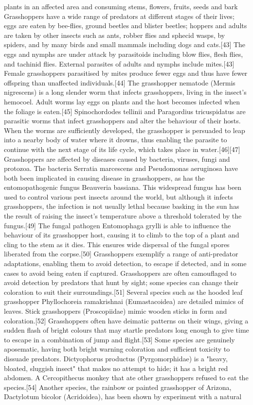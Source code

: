 \documentclass[twoside, 12pt, letterpaper]{report}\usepackage[]{graphicx}\usepackage[]{color}
\begin{document}
\begin{multicols*}{2}
plants in an affected area and consuming stems, flowers, fruits, seeds and bark Grasshoppers have a wide range of predators at different stages of their lives; eggs are eaten by bee-flies, ground beetles and blister beetles; hoppers and adults are taken by other insects such as ants, robber flies and sphecid wasps, by spiders, and by many birds and small mammals including dogs and cats.[43] The eggs and nymphs are under attack by parasitoids including blow flies, flesh flies, and tachinid flies. External parasites of adults and nymphs include mites.[43] Female grasshoppers parasitised by mites produce fewer eggs and thus have fewer offspring than unaffected individuals.[44] The grasshopper nematode (Mermis nigrescens) is a long slender worm that infects grasshoppers, living in the insect's hemocoel. Adult worms lay eggs on plants and the host becomes infected when the foliage is eaten.[45] Spinochordodes tellinii and Paragordius tricuspidatus are parasitic worms that infect grasshoppers and alter the behaviour of their hosts. When the worms are sufficiently developed, the grasshopper is persuaded to leap into a nearby body of water where it drowns, thus enabling the parasite to continue with the next stage of its life cycle, which takes place in water.[46][47] Grasshoppers are affected by diseases caused by bacteria, viruses, fungi and protozoa. The bacteria Serratia marcescens and Pseudomonas aeruginosa have both been implicated in causing disease in grasshoppers, as has the entomopathogenic fungus Beauveria bassiana. This widespread fungus has been used to control various pest insects around the world, but although it infects grasshoppers, the infection is not usually lethal because basking in the sun has the result of raising the insect's temperature above a threshold tolerated by the fungus.[49] The fungal pathogen Entomophaga grylli is able to influence the behaviour of its grasshopper host, causing it to climb to the top of a plant and cling to the stem as it dies. This ensures wide dispersal of the fungal spores liberated from the corpse.[50] Grasshoppers exemplify a range of anti-predator adaptations, enabling them to avoid detection, to escape if detected, and in some cases to avoid being eaten if captured. Grasshoppers are often camouflaged to avoid detection by predators that hunt by sight; some species can change their coloration to suit their surroundings.[51] Several species such as the hooded leaf grasshopper Phyllochoreia ramakrishnai (Eumastacoidea) are detailed mimics of leaves. Stick grasshoppers (Proscopiidae) mimic wooden sticks in form and coloration.[52] Grasshoppers often have deimatic patterns on their wings, giving a sudden flash of bright colours that may startle predators long enough to give time to escape in a combination of jump and flight.[53] Some species are genuinely aposematic, having both bright warning coloration and sufficient toxicity to dissuade predators. Dictyophorus productus (Pyrgomorphidae) is a "heavy, bloated, sluggish insect" that makes no attempt to hide; it has a bright red abdomen. A Cercopithecus monkey that ate other grasshoppers refused to eat the species.[54] Another species, the rainbow or painted grasshopper of Arizona, Dactylotum bicolor (Acridoidea), has been shown by experiment with a natural 
\end{multicols*}
\end{document}
